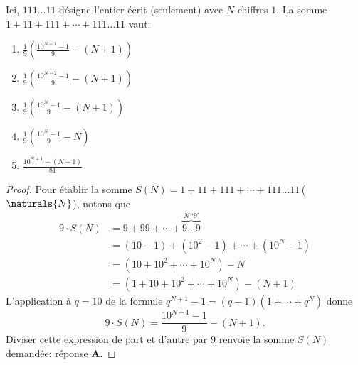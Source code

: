 %
Ici, $111\dots 11$ désigne l'entier écrit (seulement) avec $N$ chiffres $1$.
La somme $1 + 11 + 111 + \cdots + 111\dots 11$ vaut:
\begin{enumerate}
  \item $\frac{1}{9}\!\left(\frac{10^{N+1}-1}{9} - (N+1)\right)$
  \item $\frac{1}{9}\!\left(\frac{10^{N+2}-1}{9} - (N+1)\right)$
  \item $\frac{1}{9}\!\left(\frac{10^{N}-1}{9} - (N+1)\right)$
  \item $\frac{1}{9}\!\left(\frac{10^{N}-1}{9} - N\right)$
  \item $\frac{10^{N+1}-(N+1)}{81}$
\end{enumerate}
%
%
\begin{proof}
Pour établir la somme $S(N) = 1 + 11 + 111 + \cdots + 111\dots 11$\;\,($\naturals{N}$), notons que  
%
\begin{align}
  9 \cdot S(N) & = 9 + 99 + \cdots + \overbrace{9 \dots 9}^{N \text{ `$9$'}} \\
  & = (10-1) + (10^2 - 1) + \cdots + (10^N - 1) \\
  & = (10 + 10^2 + \cdots + 10^N) - N \\
  & = (1 + 10 + 10^2 + \cdots + 10^N) - (N + 1)
\end{align}
%
L'application à $q=10$ de la formule $q^{N+1} - 1  = (q-1)(1 + \cdots + q^N)$ donne 
% 
\begin{equation}
  9 \cdot S(N) = \frac{10^{N+1} - 1}{9} - (N+1).
\end{equation}
%
Diviser cette expression de part et d'autre par $9$ renvoie la somme $S(N)$ demandée: réponse \textbf{A}.
\end{proof}